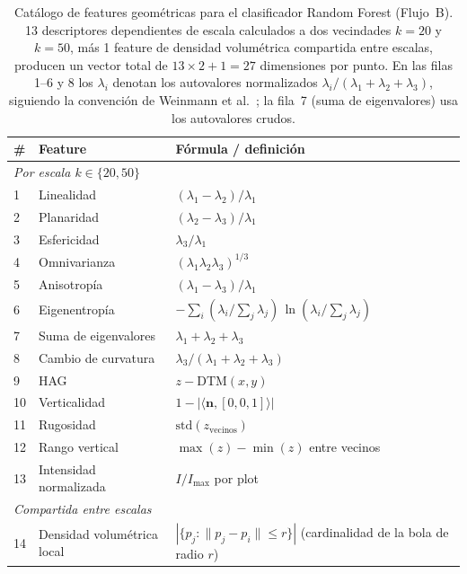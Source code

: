 \documentclass[runningheads]{llncs}
\begin{document}
\begin{table}[t]
\centering
\caption{Cat\'alogo de features geom\'etricas para el clasificador Random Forest (Flujo~B). 13 descriptores dependientes de escala calculados a dos vecindades $k\!=\!20$ y $k\!=\!50$, m\'as 1 feature de densidad volum\'etrica compartida entre escalas, producen un vector total de $13 \times 2 + 1 = 27$ dimensiones por punto. En las filas 1--6 y 8 los $\lambda_i$ denotan los autovalores normalizados $\lambda_i / (\lambda_1+\lambda_2+\lambda_3)$, siguiendo la convenci\'on de Weinmann et al.~\cite{weinmann2015}; la fila~7 (suma de eigenvalores) usa los autovalores crudos.}\label{tab:rf-features}
\begin{tabular}{lll}
\toprule
\# & Feature & F\'ormula / definici\'on \\
\midrule
\multicolumn{3}{l}{\emph{Por escala $k \in \{20, 50\}$}} \\
1  & Linealidad             & $(\lambda_1 - \lambda_2)/\lambda_1$       \\
2  & Planaridad             & $(\lambda_2 - \lambda_3)/\lambda_1$       \\
3  & Esfericidad            & $\lambda_3/\lambda_1$                     \\
4  & Omnivarianza           & $(\lambda_1\lambda_2\lambda_3)^{1/3}$     \\
5  & Anisotrop\'ia          & $(\lambda_1 - \lambda_3)/\lambda_1$       \\
6  & Eigenentrop\'ia        & $-\sum_i (\lambda_i/\!\sum_j\!\lambda_j)\,\ln(\lambda_i/\!\sum_j\!\lambda_j)$ \\
7  & Suma de eigenvalores   & $\lambda_1 + \lambda_2 + \lambda_3$       \\
8  & Cambio de curvatura    & $\lambda_3/(\lambda_1+\lambda_2+\lambda_3)$ \\
9  & HAG                    & $z - \text{DTM}(x,y)$                     \\
10 & Verticalidad           & $1 - |\langle \mathbf{n}, [0,0,1]\rangle|$ \\
11 & Rugosidad              & $\text{std}(z_{\text{vecinos}})$          \\
12 & Rango vertical         & $\max(z)-\min(z)$ entre vecinos           \\
13 & Intensidad normalizada & $I / I_{\max}$ por plot                   \\
\midrule
\multicolumn{3}{l}{\emph{Compartida entre escalas}} \\
14 & Densidad volum\'etrica local & $|\{p_j : \lVert p_j - p_i \rVert \leq r\}|$ (cardinalidad de la bola de radio $r$) \\
\bottomrule
\end{tabular}
\end{table}
\end{document}
